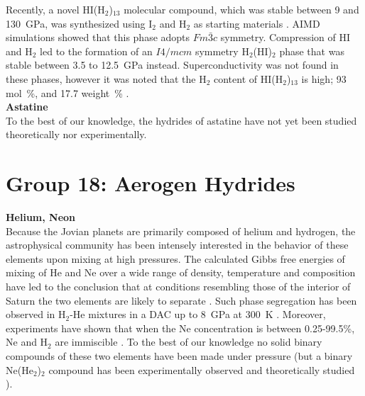 \documentclass[12pt,letterpaper,oneside]{article}
\begin{document}
Recently, a novel HI(H$_2$)$_{13}$ molecular compound, which was stable between 9 and 130~GPa, was synthesized using I$_2$ and H$_2$ as starting materials \cite{Binns:2018a}. AIMD simulations showed that this phase adopts $Fm\bar{3}c$ symmetry. Compression of HI and H$_2$ led to the formation of an $I4/mcm$ symmetry H$_2$(HI)$_2$ phase that was stable between 3.5 to 12.5~GPa instead. Superconductivity was not found in these phases, however it was noted that the H$_2$ content of HI(H$_2$)$_{13}$ is high; 93 mol~\%, and 17.7 weight~\% . \\

\noindent\textbf{Astatine} \\
%
To the best of our knowledge, the hydrides of astatine have not yet been studied theoretically nor experimentally.





\section{Group 18: Aerogen Hydrides}

\noindent\textbf{Helium, Neon} \\ 
%
Because the Jovian planets are primarily composed of helium and hydrogen, the astrophysical community has been intensely interested in the behavior of these elements upon mixing at high pressures. The calculated Gibbs free energies of mixing of He and Ne over a wide range of density, temperature and composition have led to the conclusion that at conditions resembling those of the interior of Saturn the two elements are likely to separate \cite{Morales:2009a,Morales:2013}. Such phase segregation has been observed in H$_2$-He mixtures in a DAC up to 8~GPa at 300~K \cite{Loubeyre:1985}. Moreover, experiments have shown that when the Ne concentration is between 0.25-99.5\%, Ne and H$_2$ are immiscible \cite{Barrett:1966a}. To the best of our knowledge no solid binary compounds of these two elements have been made under pressure (but a binary Ne(He$_2$)$_2$ compound has been experimentally observed and theoretically studied \cite{Loubeyre:1993,Cazorla:2009}).  \\
\end{document}
